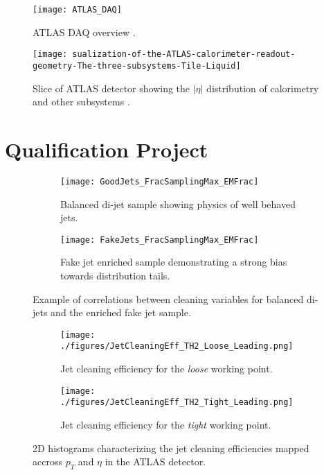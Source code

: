 \documentclass[12pt]{article}
\begin{document}
\begin{figure}[h]
    \centering
    \texttt{[image: ATLAS\_DAQ]}
    \caption{ATLAS DAQ overview \cite{Aad_2024}.}
    \label{fig:daq_schematic}
\end{figure}

\begin{figure}[h]
    \centering
    \texttt{[image: sualization-of-the-ATLAS-calorimeter-readout-geometry-The-three-subsystems-Tile-Liquid]}
    \caption{Slice of ATLAS detector showing the $|\eta|$ distribution of
    calorimetry and other subsystems \cite{cool_calo_XS}.}
    \label{fig:calo_cutaway_eta}
\end{figure}

\clearpage
\newpage
\section{Qualification Project}
\begin{figure}[h]
    \centering
    \begin{subfigure}[t]{.48\textwidth}
        \centering
        \texttt{[image: GoodJets\_FracSamplingMax\_EMFrac]}
        \caption{Balanced di-jet sample showing physics of well behaved jets.}
        \label{subfig:good_jets_th2}
    \end{subfigure}
    \hfill
    \begin{subfigure}[t]{.48\textwidth}
        \centering
        \texttt{[image: FakeJets\_FracSamplingMax\_EMFrac]}
        \caption{Fake jet enriched sample demonstrating a strong bias towards
        distribution tails.}
        \label{subfig:fake_jets_th2}
    \end{subfigure}
    \caption{Example of correlations between cleaning variables for balanced
    di-jets and the enriched fake jet sample.}
\label{fig:cleaning_variables}
\end{figure}

\begin{figure}[h]
    \centering
    \begin{subfigure}[t]{.48\textwidth}
        \centering
        \texttt{[image: ./figures/JetCleaningEff\_TH2\_Loose\_Leading.png]}
        \caption{Jet cleaning efficiency for the \textit{loose} working point.}
        \label{subfig:cleaning_perf_th2_loose}
    \end{subfigure}
    \hfill
    \begin{subfigure}[t]{.48\textwidth}
        \centering
        \texttt{[image: ./figures/JetCleaningEff\_TH2\_Tight\_Leading.png]}
        \caption{Jet cleaning efficiency for the \textit{tight} working point.}
        \label{subfig:cleaning_perf_th2_tight}
    \end{subfigure}
\caption{2D histograms characterizing the jet cleaning efficiencies mapped
accross $p_T$ and $\eta$ in the ATLAS detector.}
\label{fig:cleaning_performance_th2}
\end{figure}
\end{document}
